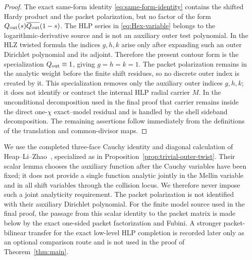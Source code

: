 \begin{proof}
The exact same-form identity \eqref{eq:same-form-identity} contains the shifted
Hardy product and the packet polarization, but no factor of the form
$Q_{\rm out}(s)\overline{Q_{\rm out}}(1-s)$. The HLP series in
\eqref{eq:Hex-variable} belongs to the logarithmic-derivative source and is not
an auxiliary outer test polynomial. In the HLZ twisted formula the indices
$g,h,k$ arise only after expanding such an outer Dirichlet polynomial and its
adjoint. Therefore the present contour form is the specialization
$Q_{\rm out}\equiv1$, giving $g=h=k=1$. The packet polarization remains in the
analytic weight before the finite shift residues, so no discrete outer index is
created by it. This specialization removes only the auxiliary outer indices
$g,h,k$; it does not identify or contract the internal HLP radial carrier $M$.
In the unconditional decomposition used in the final proof that carrier remains
inside the direct one-$\chi$ exact--model residual and is handled by the shell
sideband decomposition. The remaining assertions follow immediately from the
definitions of the translation and common-divisor maps.
\end{proof}

\begin{remark}
We use the completed three-face Cauchy identity and diagonal calculation of
Heap--Li--Zhao~\cite{HLZ}, specialized as in
Proposition~\ref{prop:trivial-outer-twist}.  Their scalar lemma chooses the
auxiliary function after the Cauchy variables have been fixed; it does not
provide a single function analytic jointly in the Mellin variable and in all
shift variables through the collision locus.  We therefore never impose such a
joint analyticity requirement.  The packet polarization is not identified with
their auxiliary Dirichlet polynomial.  For the finite model source used in the
final proof, the passage from this scalar identity to the packet matrix is made
below by the exact one-sided packet factorization and Fubini.  A stronger
packet-bilinear transfer for the exact low-level HLP completion is recorded
later only as an optional comparison route and is not used in the proof of
Theorem~\ref{thm:main}.
\end{remark}

